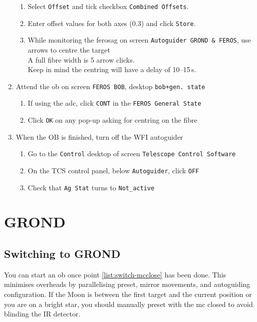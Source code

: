 \documentclass[11pt,fleqn,a4paper]{book}
\begin{document}
\begin{enumerate}
\begin{enumerate}
         \item Select \texttt{Offset} and tick checkbox \texttt{Combined Offsets}.
         \item Enter offset values for both axes (0.3) and click \texttt{Store}.
         \item While monitoring the \gls{ferosag} on screen \texttt{Autoguider GROND \& FEROS}, use arrows to centre the target\\
              A full fibre width is 5 arrow clicks.\\
              Keep in mind the centring will have a delay of 10--15\,s. 
    \end{enumerate}
    \item Attend the \gls{ob} on  screen \texttt{FEROS BOB}, \gls{desktop} \texttt{bob+gen. state}
    \begin{enumerate}
        \item If using the \gls{adc}, click \texttt{CONT} in the \texttt{FEROS \gls{General State}}
        \item Click \texttt{OK} on any pop-up asking for centring on the fibre
    \end{enumerate}
    \item When the OB is finished, turn off the WFI autoguider
        \begin{enumerate}
            \item Go to the \texttt{Control} \gls{desktop} of screen \texttt{Telescope Control Software}
            \item On the \gls{TCS control panel}, below \texttt{Autoguider}, click \texttt{OFF} 
            \item Check that \texttt{Ag Stat} turns to \texttt{Not\_active}
        \end{enumerate}
\end{enumerate}

\section{GROND}

\subsection{Switching to GROND}

You can start an \gls{ob} once point \ref{list:switch-mcclose} has been done.  This minimises overheads by parallelising \gls{preset}, mirror movements, and autoguiding configuration.  If the Moon is between the first target and the current position or you are on a bright star, you should manually preset with the \gls{mc} closed to avoid blinding the IR detector.
\end{document}
